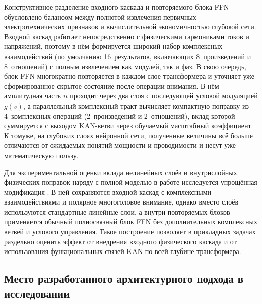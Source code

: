 Конструктивное разделение входного каскада  и
повторяемого блока FFN обусловлено балансом между полнотой извлечения
первичных электротехнических признаков и вычислительной экономичностью
глубокой сети. Входной каскад работает непосредственно с физическими
гармониками токов и напряжений, поэтому в нём формируется широкий набор
комплексных взаимодействий (по умолчанию 16~результатов, включающих
8~произведений и 8~отношений) с полным извлечением как модулей, так и
фаз. В свою очередь, блок FFN многократно повторяется в каждом слое
трансформера и уточняет уже сформированное скрытое состояние после
операции внимания. В нём амплитудная часть $u$ проходит через два слоя
 с последующей угловой модуляцией $g(v)$, а параллельный
комплексный тракт вычисляет компактную поправку из 4~комплексных операций
(2~произведений и 2~отношений), вклад которой суммируется с выходом
KAN-ветви через обучаемый масштабный коэффициент. К томуже, на глубоких
слоях нейронной сети, полученные величины всё больше отличаются от
ожидаемых понятий мощности и проводимости и несут уже математическую
пользу.


Для экспериментальной оценки вклада нелинейных слоёв  и
внутрислойных физических поправок наряду с полной моделью
 в работе исследуется упрощённая
модификация . В ней сохраняются входной
каскад  с комплексными взаимодействиями и полярное
многоголовое внимание, однако вместо слоёв  используются
стандартные линейные слои, а внутри повторяемых блоков применяется
обычный полносвязный блок FFN без дополнительных комплексных ветвей и
углового управления. Такое построение позволяет в прикладных задачах
раздельно оценить эффект от внедрения входного физического каскада и от
использования функциональных связей KAN по всей глубине трансформера.

\subsection{Место разработанного архитектурного подхода в исследовании}
\label{sec:ch4_architecture_summary}

